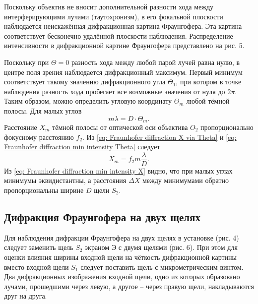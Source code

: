 \documentclass[a4paper,12pt]{article}
\begin{document}
Поскольку объектив не вносит дополнительной разности хода между интерферирующими лучами (таутохронизм), в его фокальной плоскости наблюдается неискажённая дифракционная картина Фраунгофера. Эта картина соответствует бесконечно удалённой плоскости наблюдения. Распределение интенсивности в дифракционной картине Фраунгофера представлено на рис. 5.

Поскольку при $\Theta = 0$ разность хода между любой парой лучей равна нулю, в центре поля зрения наблюдается дифракционный максимум. Первый минимум соответствует такому значению дифракционного угла $\Theta_1$, при котором в точке наблюдения разность хода пробегает все возможные значения от нуля до $2\pi$. Таким образом, можно определить угловую координату $\Theta_m$ любой тёмной полосы. Для малых углов
\begin{equation}\label{eq: Fraunhofer diffraction min intensity Theta}
    m\lambda = D \cdot \Theta_m.
\end{equation}
Расстояние $X_m$ тёмной полосы от оптической оси объектива $O_2$ пропорционально фокусному расстоянию $f_2$. Из \eqref{eq: Fraunhofer diffraction X via Theta} и \eqref{eq: Fraunhofer diffraction min intensity Theta} следует
\begin{equation}\label{eq: Fraunhofer diffraction min intensity X}
    X_m = f_2m\frac{\lambda}{D}.
\end{equation}
Из \eqref{eq: Fraunhofer diffraction min intensity X} видно, что при малых углах минимумы эквидистантны, а расстояния $\Delta X$ между минимумами обратно пропорциональны ширине $D$ щели $S_2$.

\subsection{Дифракция Фраунгофера на двух щелях}

Для наблюдения дифракции Фраунгофера на двух щелях в установке (рис. 4) следует заменить щель
$S_2$ экраном $Э$ с двумя щелями (рис. 6). При этом для оценки влияния ширины входной щели на чёткость дифракционной картины вместо входной щели $S_1$ следует поставить щель с микрометрическим винтом. Два дифракционных изображения входной щели, одно из которых образовано лучами, прошедшими через левую, а другое -- через правую щели, накладываются друг на друга.
\end{document}

